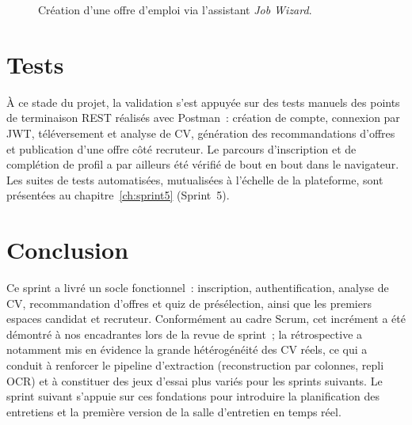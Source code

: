 \begin{figure}[H]
  \centering
  \caption{Création d'une offre d'emploi via l'assistant \textit{Job Wizard}.}
  \label{fig:job-wizard}
\end{figure}

\section{Tests}

À ce stade du projet, la validation s'est appuyée sur des tests manuels des points de terminaison REST réalisés avec Postman~: création de compte, connexion par JWT, téléversement et analyse de CV, génération des recommandations d'offres et publication d'une offre côté recruteur. Le parcours d'inscription et de complétion de profil a par ailleurs été vérifié de bout en bout dans le navigateur. Les suites de tests automatisées, mutualisées à l'échelle de la plateforme, sont présentées au chapitre~\ref{ch:sprint5} (Sprint~5).

\section{Conclusion}

Ce sprint a livré un socle fonctionnel~: inscription, authentification, analyse de CV, recommandation d'offres et quiz de présélection, ainsi que les premiers espaces candidat et recruteur. Conformément au cadre Scrum, cet incrément a été démontré à nos encadrantes lors de la revue de sprint~; la rétrospective a notamment mis en évidence la grande hétérogénéité des CV réels, ce qui a conduit à renforcer le pipeline d'extraction (reconstruction par colonnes, repli OCR) et à constituer des jeux d'essai plus variés pour les sprints suivants. Le sprint suivant s'appuie sur ces fondations pour introduire la planification des entretiens et la première version de la salle d'entretien en temps réel.
